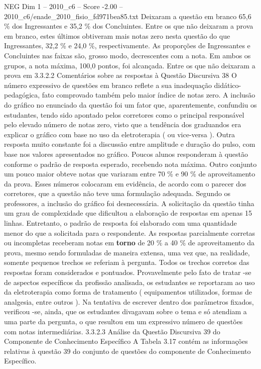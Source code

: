 \begin{textsample}{NEG Dim 1 – 2010\_c6 – Score -2.00 – 2010\_c6/enade\_2010\_fisio\_fd971bea85.txt}
Deixaram a questão em branco 65,6 \% dos Ingressantes e 35,2 \% dos Concluintes.
Entre os que não deixaram a prova em branco, estes últimos obtiveram mais notas zero nesta questão do que Ingressantes, 32,2 \% e 24,0 \%, respectivamente.
As proporções de Ingressantes e Concluintes nas faixas são, grosso modo, decrescentes com a nota.
Em ambos os grupos, a nota máxima, 100,0 pontos, foi alcançada.
Entre os que não deixaram a prova em 3.3.2.2 Comentários sobre as respostas à Questão Discursiva 38 O número expressivo de questões em branco reflete a sua inadequação didático-pedagógica, fato comprovado também pelo maior índice de notas zero.
A inclusão do gráfico no enunciado da questão foi um fator que, aparentemente, confundiu os estudantes, tendo sido apontado pelos corretores como o principal responsável pelo elevado número de notas zero, visto que a tendência dos graduandos era explicar o gráfico com base no uso da eletroterapia ( ou vice-versa ).
Outra resposta muito constante foi a discussão entre amplitude e duração do pulso, com base nos valores apresentados no gráfico.
Poucos alunos responderam à questão conforme o padrão de resposta esperado, recebendo nota máxima.
Outro conjunto um pouco maior obteve notas que variaram entre 70 \% e 90 \% de aproveitamento da prova.
Esses números colocaram em evidência, de acordo com o parecer dos corretores, que a questão não teve uma formulação adequada.
Segundo os professores, a inclusão do gráfico foi desnecessária.
A solicitação da questão tinha um grau de complexidade que dificultou a elaboração de respostas em apenas 15 linhas.
Entretanto, o padrão de resposta foi elaborado com uma quantidade menor do que a solicitada para o respondente.
As respostas parcialmente corretas ou incompletas receberam notas em \textbf{torno} de 20 \% a 40 \% de aproveitamento da prova, mesmo sendo formuladas de maneira extensa, uma vez que, na realidade, somente pequenos trechos se referiam à pergunta.
Todos os trechos corretos das respostas foram considerados e pontuados.
Provavelmente pelo fato de tratar -se de aspectos específicos da profissão analisada, os estudantes se reportaram ao uso da eletroterapia como forma de tratamento ( equipamentos utilizados, formas de analgesia, entre outros ).
Na tentativa de escrever dentro dos parâmetros fixados, verificou -se, ainda, que os estudantes divagavam sobre o tema e só atendiam a uma parte da pergunta, o que resultou em um expressivo número de questões com notas intermediárias. 3.3.2.3 Análise da Questão Discursiva 39 do Componente de Conhecimento Específico A Tabela 3.17 contém as informações relativas à questão 39 do conjunto de questões do componente de Conhecimento Específico.

\end{textsample}
